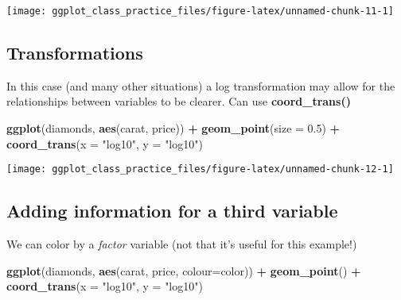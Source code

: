 \documentclass[
]{article}
\newenvironment{Shaded}{\begin{snugshade}}{\end{snugshade}}
\newcommand{\AttributeTok}[1]{\textcolor[rgb]{0.13,0.29,0.53}{#1}}
\newcommand{\FloatTok}[1]{\textcolor[rgb]{0.00,0.00,0.81}{#1}}
\newcommand{\FunctionTok}[1]{\textcolor[rgb]{0.13,0.29,0.53}{\textbf{#1}}}
\newcommand{\NormalTok}[1]{#1}
\newcommand{\SpecialCharTok}[1]{\textcolor[rgb]{0.81,0.36,0.00}{\textbf{#1}}}
\newcommand{\StringTok}[1]{\textcolor[rgb]{0.31,0.60,0.02}{#1}}
\begin{document}
\begin{center}\texttt{[image: ggplot\_class\_practice\_files/figure-latex/unnamed-chunk-11-1]} \end{center}

\hypertarget{transformations}{%
\subsection{Transformations}\label{transformations}}

In this case (and many other situations) a log transformation may allow
for the relationships between variables to be clearer. Can use
\textbf{coord\_trans()}

\begin{Shaded}
\begin{Highlighting}[]
\FunctionTok{ggplot}\NormalTok{(diamonds, }\FunctionTok{aes}\NormalTok{(carat, price)) }\SpecialCharTok{+} \FunctionTok{geom\_point}\NormalTok{(}\AttributeTok{size =} \FloatTok{0.5}\NormalTok{) }\SpecialCharTok{+}
\FunctionTok{coord\_trans}\NormalTok{(}\AttributeTok{x =} \StringTok{"log10"}\NormalTok{, }\AttributeTok{y =} \StringTok{"log10"}\NormalTok{)}
\end{Highlighting}
\end{Shaded}

\begin{center}\texttt{[image: ggplot\_class\_practice\_files/figure-latex/unnamed-chunk-12-1]} \end{center}

\hypertarget{adding-information-for-a-third-variable}{%
\subsection{Adding information for a third
variable}\label{adding-information-for-a-third-variable}}

We can color by a \emph{factor} variable (not that it's useful for this
example!)

\begin{Shaded}
\begin{Highlighting}[]
\FunctionTok{ggplot}\NormalTok{(diamonds, }\FunctionTok{aes}\NormalTok{(carat, price, }\AttributeTok{colour=}\NormalTok{color)) }\SpecialCharTok{+} \FunctionTok{geom\_point}\NormalTok{() }\SpecialCharTok{+} 
    \FunctionTok{coord\_trans}\NormalTok{(}\AttributeTok{x =} \StringTok{"log10"}\NormalTok{, }\AttributeTok{y =} \StringTok{"log10"}\NormalTok{)}
\end{Highlighting}
\end{Shaded}
\end{document}
